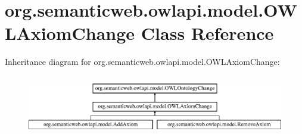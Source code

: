 \hypertarget{classorg_1_1semanticweb_1_1owlapi_1_1model_1_1_o_w_l_axiom_change}{\section{org.\-semanticweb.\-owlapi.\-model.\-O\-W\-L\-Axiom\-Change Class Reference}
\label{classorg_1_1semanticweb_1_1owlapi_1_1model_1_1_o_w_l_axiom_change}
}
Inheritance diagram for org.\-semanticweb.\-owlapi.\-model.\-O\-W\-L\-Axiom\-Change\-:\begin{figure}[H]
\begin{center}
\leavevmode
\includegraphics[height=2.633229cm]{classorg_1_1semanticweb_1_1owlapi_1_1model_1_1_o_w_l_axiom_change}
\end{center}
\end{figure}
